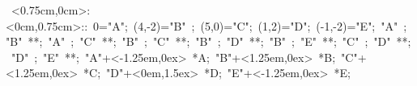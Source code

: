 \hbox{
\xy    <0.75cm,0cm>:<0cm,0.75cm>::
       0="A";     (4,-2)="B" ; (5,0)="C";  (1,2)="D";   
	   (-1,-2)="E"; 
	   "A" ; "B" **\dir{-}; 
       "A" ; "C" **\dir{-}; 
       "B" ; "C" **\dir{-}; 
       "B" ; "D" **\dir{-}; 
       "B" ; "E" **\dir{-}; 
       "C" ; "D" **\dir{-}; 
       "D" ; "E" **\dir{-}; 
       "A"+<-1.25em,0ex> *{A};
	   "B"+<1.25em,0ex> *{B};
       "C"+<1.25em,0ex> *{C};
       "D"+<0em,1.5ex> *{D};
       "E"+<-1.25em,0ex> *{E};
       \endxy}
